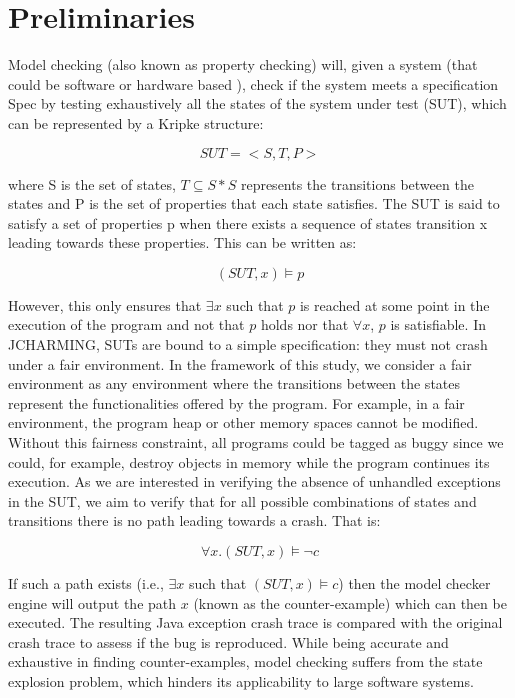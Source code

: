 \documentclass[times]{smrauth}
\begin{document}
\section{Preliminaries}

Model checking (also known as property checking) will, given a system (that could be software \cite{Visser2003} or hardware based \cite{kropf1999introduction}), check if the system meets a specification Spec by testing exhaustively all the states of the system under test (SUT), which can be represented by a Kripke \cite{Kripke1963} structure:

\begin{equation}
SUT = <S,T,P>
\end{equation}

where S is the set of states, $T \subseteq S * S$ represents the transitions between the states and P is the set of properties that each state satisfies. The SUT is said to satisfy a set of properties p when there exists a sequence of states transition x leading towards these properties. This can be written as:

\begin{equation}
(SUT, x)  \models p
\end{equation}

However, this only ensures that $\exists x$ such that $p$ is reached at some point in the execution of the program and not that $p$ holds nor that $\forall x$, $p$ is satisfiable. In JCHARMING, SUTs are bound to a simple specification: they must not crash under a fair environment. In the framework of this study, we consider a fair environment as any environment where the transitions between the states represent the functionalities offered by the program. For example, in a fair environment, the program heap or other memory spaces cannot be modified. Without this fairness constraint, all programs could be tagged as buggy since we could, for example, destroy objects in memory while the program continues its execution. As we are interested in verifying the absence of unhandled exceptions in the SUT, we aim to verify that for all possible combinations of states and transitions there is no path leading towards a crash. That is:

\begin{equation}
\forall x.(SUT, x) \models \neg c
\end{equation}

If such a path exists (i.e., $\exists x$  such that $(SUT, x)  \models c$) then the model checker engine will output the path $x$ (known as the counter-example) which can then be executed. The resulting Java exception crash trace is compared with the original crash trace to assess if the bug is reproduced. While  being  accurate and exhaustive in finding counter-examples, model checking suffers from the state explosion problem, which hinders its applicability to large software systems.
\end{document}

